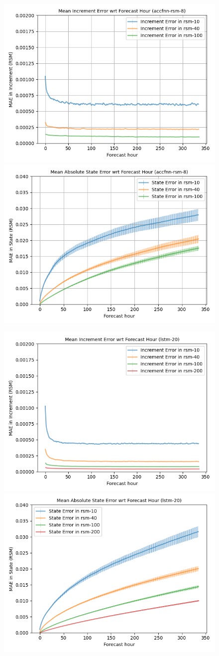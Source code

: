 \begin{figure}[hp!]
    \centering

    \includegraphics[width=.42\linewidth,draft=false]{figures/horizons/eval_test_accfnn-rsm-8_rsm_horizon_na_res.png}
    \includegraphics[width=.42\linewidth,draft=false]{figures/horizons/eval_test_accfnn-rsm-8_rsm_horizon_na_state.png}

    \includegraphics[width=.42\linewidth,draft=false]{figures/horizons/eval_test_lstm-20_rsm_horizon_na_res.png}
    \includegraphics[width=.42\linewidth,draft=false]{figures/horizons/eval_test_lstm-20_rsm_horizon_na_state.png}


\end{figure}
